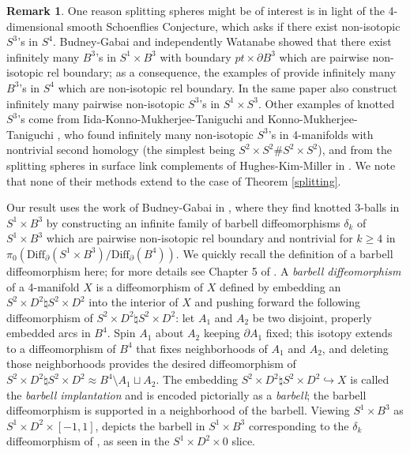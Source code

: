 \documentclass[11pt,letterpaper,twoside]{amsart}
\theoremstyle{definition}
\newtheorem{remark}[theorem]{Remark}
\begin{document}
\begin{remark}
    One reason splitting spheres might be of interest is in light of the 4-dimensional smooth Schoenflies Conjecture, which asks if there exist non-isotopic $S^3$'s in $S^4$. Budney-Gabai \cite{BG} and independently Watanabe \cite{Wa} showed that there exist infinitely many $B^3$'s in $S^1 \times B^3$ with boundary $pt \times \partial B^3$ which are pairwise non-isotopic rel boundary; as a consequence, the examples of \cite{BG} provide infinitely many $B^3$'s in $S^4$ which are non-isotopic rel boundary. In the same paper \cite{BG} also construct infinitely many pairwise non-isotopic $S^3$'s in $S^1 \times S^3$. Other examples of knotted $S^3$'s come from Iida-Konno-Mukherjee-Taniguchi \cite{IKMT} and Konno-Mukherjee-Taniguchi \cite{KMT}, who found infinitely many non-isotopic $S^3$'s in 4-manifolds with nontrivial second homology (the simplest being $S^2 \times S^2 \# S^2 \times S^2$), and from the splitting spheres in surface link complements of Hughes-Kim-Miller in \cite{HKM}. We note that none of their methods extend to the case of Theorem \ref{splitting}.
\end{remark}

\noindent Our result uses the work of Budney-Gabai in \cite{BG}, where they find knotted 3-balls in $S^1 \times B^3$ by constructing an infinite family of barbell diffeomorphisms $\delta_k$ of $S^1 \times B^3$ which are pairwise non-isotopic rel boundary and nontrivial for $k \geq 4$ in $\pi_0(\text{Diff}_\partial(S^1 \times B^3)/\text{Diff}_\partial(B^4))$. We quickly recall the definition of a barbell diffeomorphism here; for more details see Chapter 5 of \cite{BG}. A \textit{barbell diffeomorphism} of a 4-manifold $X$ is a diffeomorphism of $X$ defined by embedding an $S^2 \times D^2 \natural S^2 \times D^2$ into the interior of $X$ and pushing forward the following diffeomorphism of $S^2 \times D^2 \natural S^2 \times D^2$: let $A_1$ and $A_2$ be two disjoint, properly embedded arcs in $B^4$. Spin $A_1$ about $A_2$ keeping $\partial A_1$ fixed; this isotopy extends to a diffeomorphism of $B^4$ that fixes neighborhoods of $A_1$ and $A_2$, and deleting those neighborhoods provides the desired diffeomorphism of $S^2 \times D^2 \natural S^2 \times D^2 \approx B^4 \setminus A_1 \sqcup A_2$. The embedding $S^2 \times D^2 \natural S^2 \times D^2 \hookrightarrow X$ is called the \textit{barbell implantation} and is encoded pictorially as a \textit{barbell}; the barbell diffeomorphism is supported in a neighborhood of the barbell. Viewing $S^1 \times B^3$ as $S^1\times D^2 \times [-1,1]$,  depicts the barbell in $S^1 \times B^3$ corresponding to the $\delta_k$ diffeomorphism of \cite{BG}, as seen in the $S^1 \times D^2 \times 0$ slice. 
\end{document}
